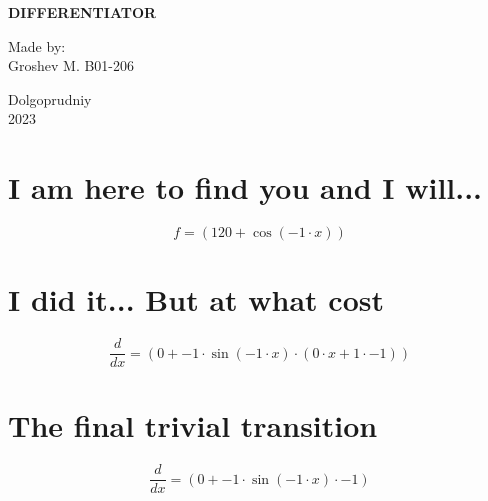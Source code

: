 \documentclass[a4paper, 12pt]{article}
\title{}
\date{}
\begin{document}

    \begin{titlepage}
    \maketitle
    \thispagestyle{empty}

            \begin{center}
                  \Large \textbf{DIFFERENTIATOR}
            \end{center}

             \vspace{20em}
             \begin{flushright}
                 \normalsize Made by: \\
                             Groshev M. B01-206
             \end{flushright}

             \begin{center}
                    \vfill \normalsize Dolgoprudniy \\ 2023
             \end{center}
    \end{titlepage}


\section{I am here to find you and I will...}\begin{equation*}
    f = ({{120}}+{\cos({{{-1}}\cdot{{x}}})})
\end{equation*}

\section{I did it... But at what cost}\begin{equation*}
    \frac{d}{dx} = ({{0}}+{{{{-1}}\cdot{\sin({{{-1}}\cdot{{x}}})}}\cdot{({{{0}}\cdot{{x}}}+{{{1}}\cdot{{-1}}})}})
\end{equation*}

\section{The final trivial transition}\begin{equation*}
    \frac{d}{dx} = ({{0}}+{{{{-1}}\cdot{\sin({{{-1}}\cdot{{x}}})}}\cdot{{-1}}})
\end{equation*}
\end{document}
